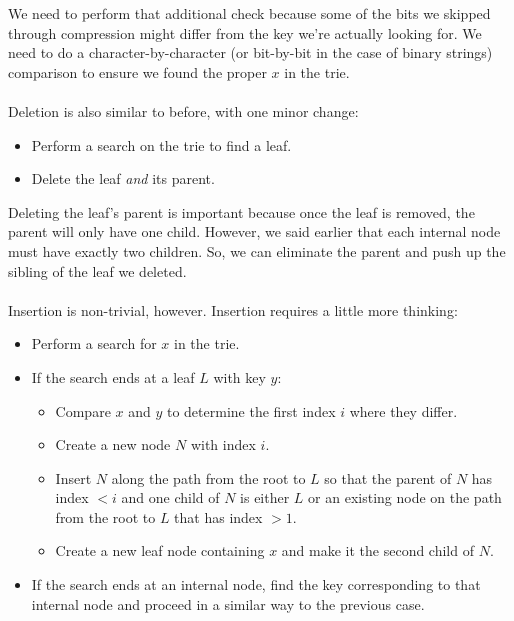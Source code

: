 \documentclass[]{article}
\theoremstyle{definition}
\begin{document}
			We need to perform that additional check because some of the bits we skipped through compression might differ from the key we're actually looking for. We need to do a character-by-character (or bit-by-bit in the case of binary strings) comparison to ensure we found the proper $x$ in the trie.
			\\ \\
			Deletion is also similar to before, with one minor change:
			\begin{itemize}
				\item Perform a search on the trie to find a leaf.
				\item Delete the leaf \emph{and} its parent.
			\end{itemize}

			Deleting the leaf's parent is important because once the leaf is removed, the parent will only have one child. However, we said earlier that each internal node must have exactly two children. So, we can eliminate the parent and push up the sibling of the leaf we deleted.
			\\ \\
			Insertion is non-trivial, however. Insertion requires a little more thinking:
			\begin{itemize}
				\item Perform a search for $x$ in the trie.
				\item If the search ends at a leaf $L$ with key $y$:
					\begin{itemize}
						\item Compare $x$ and $y$ to determine the first index $i$ where they differ.
						\item Create a new node $N$ with index $i$.
						\item Insert $N$ along the path from the root to $L$ so that the parent of $N$ has index $< i$ and one child of $N$ is either $L$ or an existing node on the path from the root to $L$ that has index $> 1$.
						\item Create a new leaf node containing $x$ and make it the second child of $N$.
					\end{itemize}
				\item If the search ends at an internal node, find the key corresponding to that internal node and proceed in a similar way to the previous case.
			\end{itemize}
\end{document}
